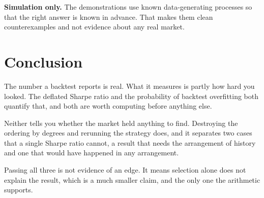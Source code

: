 \documentclass[11pt]{article}
\begin{document}
\textbf{Simulation only.} The demonstrations use known data-generating processes so that the right answer is known in advance. That makes them clean counterexamples and not evidence about any real market.

\section{Conclusion}

The number a backtest reports is real. What it measures is partly how hard you looked. The deflated Sharpe ratio and the probability of backtest overfitting both quantify that, and both are worth computing before anything else.

Neither tells you whether the market held anything to find. Destroying the ordering by degrees and rerunning the strategy does, and it separates two cases that a single Sharpe ratio cannot, a result that needs the arrangement of history and one that would have happened in any arrangement.

Passing all three is not evidence of an edge. It means selection alone does not explain the result, which is a much smaller claim, and the only one the arithmetic supports.



\end{document}
